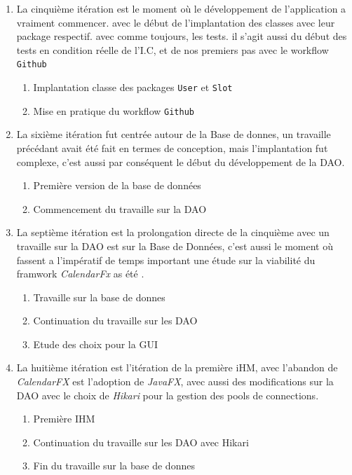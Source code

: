 \documentclass[a4paper,french,final]{memoir}
\begin{document}
\begin{enumerate}[label=\textbf{Itération~n\kern-0.5bp\textsuperscript{o}~\arabic*:},start=0]
    \item La cinquième itération est le moment où le développement de l'application a vraiment commencer.
    avec le début de l'implantation des classes avec leur package respectif. avec comme toujours,
    les tests.
    il s'agit aussi du début des tests en condition réelle de l'I.C, et de nos premiers pas avec le workflow \texttt{Github}
    \begin{enumerate}
        \item [\ding{51}] Implantation classe des packages \texttt{User} et \texttt{Slot}
        \item [\ding{51}] Mise en pratique du workflow \texttt{Github}
    \end{enumerate}

    \item La sixième itération fut centrée autour de la Base de donnes, un travaille précédant avait été
    fait en termes de conception, mais l'implantation fut complexe, c'est aussi par conséquent le début du développement
    de la DAO.
    \begin{enumerate}
        \item [\ding{51}] Première version de la base de données
        \item [\ding{51}] Commencement du travaille sur la DAO
    \end{enumerate}

    \item La septième itération est la prolongation directe de la cinquième avec un travaille sur la DAO
    est sur la Base de Données, c'est aussi le moment où fassent a l'impératif de temps important une étude
    sur la viabilité du framwork \emph{CalendarFx} as été .
    \begin{enumerate}
        \item [\ding{51}] Travaille sur la base de donnes
        \item [\ding{51}] Continuation du travaille sur les DAO
        \item [\ding{51}] Etude des choix pour la GUI
    \end{enumerate}

    \item La huitième itération est l'itération de la première iHM, avec l'abandon de \emph{CalendarFX} est l'adoption
    de \emph{JavaFX}, avec aussi des modifications sur la DAO avec le choix de \emph{Hikari} pour la gestion des pools
    de connections.
    \begin{enumerate}
        \item [\ding{51}] Première IHM
        \item [\ding{51}] Continuation du travaille sur les DAO avec Hikari
        \item []  Fin du travaille sur la base de donnes
    \end{enumerate}
    

\end{enumerate}
\end{document}
